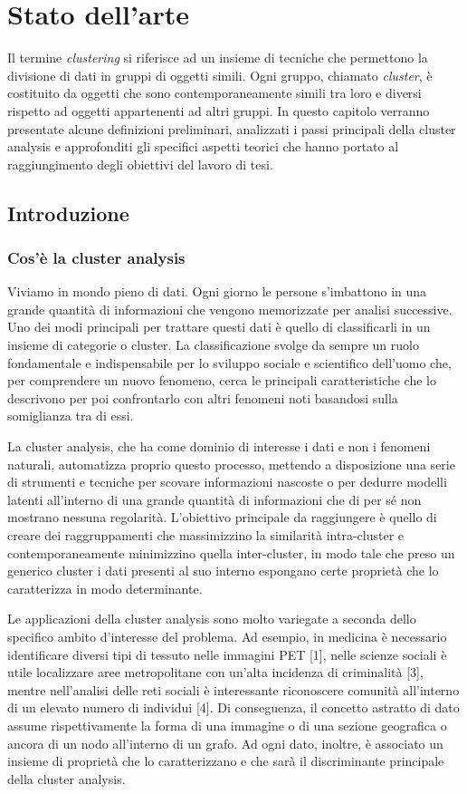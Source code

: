 \chapter{Stato dell'arte}
\label{capitolo2}
\thispagestyle{empty}

\noindent  Il termine \textit{clustering} si riferisce ad un insieme di tecniche che permettono la divisione di dati in gruppi di oggetti simili. Ogni gruppo, chiamato \textit{cluster}, \`e costituito da oggetti che sono contemporaneamente simili tra loro e diversi rispetto ad oggetti appartenenti ad altri gruppi. 
In questo capitolo verranno presentate alcune definizioni preliminari, analizzati i passi principali della cluster analysis e approfonditi gli specifici aspetti teorici che hanno portato al raggiungimento degli obiettivi del lavoro di tesi.

\section{Introduzione}
\subsection{Cos'\`e la cluster analysis} 
Viviamo in mondo pieno di dati. Ogni giorno le persone s'imbattono in una grande quantit\`a di informazioni che vengono memorizzate per analisi successive. Uno dei modi principali per trattare questi dati \`e quello di classificarli in un insieme di categorie o cluster. La classificazione svolge da sempre un ruolo fondamentale e indispensabile per lo sviluppo sociale e scientifico dell'uomo che, per comprendere un nuovo fenomeno, cerca le principali caratteristiche che lo descrivono per poi confrontarlo con altri fenomeni noti basandosi sulla somiglianza tra di essi.

La cluster analysis, che ha come dominio di interesse i dati e non i fenomeni naturali, automatizza proprio questo processo, mettendo a disposizione una serie di strumenti e tecniche per scovare informazioni nascoste o per dedurre modelli latenti all'interno di una grande quantit\`a di informazioni che di per s\'e non mostrano nessuna regolarit\`a. L'obiettivo principale da raggiungere \`e quello di creare dei raggruppamenti che massimizzino la similarit\`a intra-cluster e contemporaneamente minimizzino quella inter-cluster, in modo tale che preso un generico cluster i dati presenti al suo interno espongano certe propriet\`a che lo caratterizza in modo determinante.

Le applicazioni della cluster analysis sono molto variegate a seconda dello specifico ambito d'interesse del problema. Ad esempio, in medicina \`e necessario identificare diversi tipi di tessuto nelle immagini PET [1], nelle scienze sociali \`e utile localizzare aree metropolitane con un'alta incidenza di criminalit\`a [3], mentre nell'analisi delle reti sociali \`e interessante riconoscere comunit\`a all'interno di un elevato numero di individui [4]. Di conseguenza, il concetto astratto di dato assume rispettivamente la forma di una immagine o di una sezione geografica o ancora di un nodo all'interno di un grafo. Ad ogni dato, inoltre, \`e associato un insieme di propriet\`a che lo caratterizzano e che sar\`a il discriminante principale della cluster analysis.

